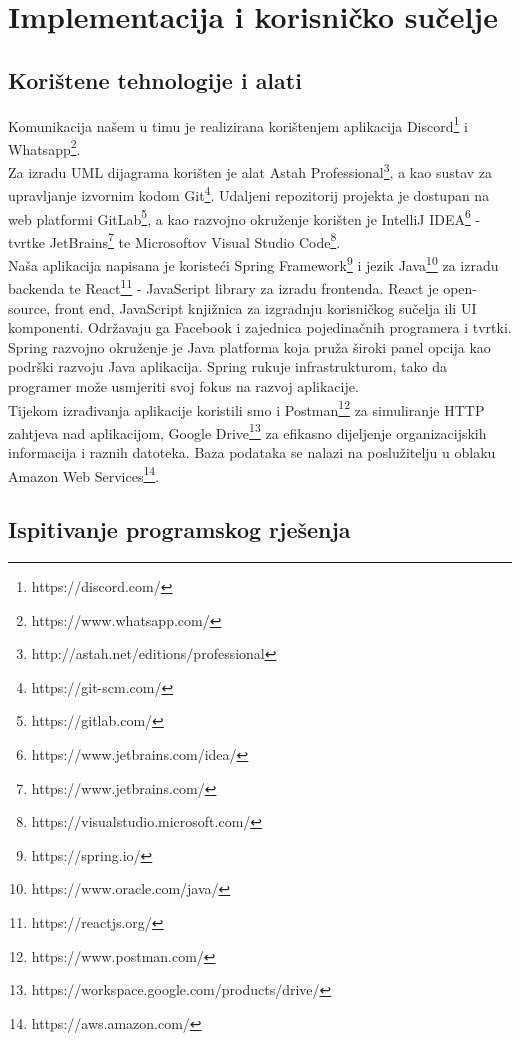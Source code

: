 \chapter{Implementacija i korisničko sučelje}
		
		
		\section{Korištene tehnologije i alati}

		Komunikacija našem u timu je realizirana korištenjem aplikacija Discord\footnote{https://discord.com/} i Whatsapp\footnote{https://www.whatsapp.com/}.\\ Za izradu UML dijagrama korišten je alat Astah Professional\footnote{http://astah.net/editions/professional}, a kao sustav za upravljanje
izvornim kodom Git\footnote{https://git-scm.com/}. Udaljeni repozitorij projekta je dostupan na web platformi GitLab\footnote{https://gitlab.com/}, a kao razvojno okruženje korišten je IntelliJ IDEA\footnote{https://www.jetbrains.com/idea/} - tvrtke JetBrains\footnote{https://www.jetbrains.com/} te Microsoftov Visual Studio Code\footnote{https://visualstudio.microsoft.com/
}. 
	\\
	 Naša aplikacija napisana je koristeći Spring Framework\footnote{https://spring.io/} i jezik Java\footnote{https://www.oracle.com/java/} za izradu backenda te React\footnote{https://reactjs.org/} - JavaScript library za izradu frontenda. React je open-source, front end, JavaScript knjižnica za izgradnju korisničkog sučelja ili UI komponenti. Održavaju ga Facebook i zajednica pojedinačnih programera i tvrtki. Spring razvojno okruženje je Java platforma koja pruža široki panel opcija kao podrški
razvoju Java aplikacija. Spring rukuje infrastrukturom, tako da programer može usmjeriti svoj
fokus na razvoj aplikacije. \\
Tijekom izrađivanja aplikacije koristili smo i Postman\footnote{https://www.postman.com/} za simuliranje HTTP zahtjeva nad aplikacijom, Google Drive\footnote{https://workspace.google.com/products/drive/} za efikasno dijeljenje organizacijskih informacija i raznih datoteka. 
Baza podataka se nalazi na poslužitelju u oblaku Amazon
Web Services\footnote{https://aws.amazon.com/}.			
			
			\eject 
		
	
		\section{Ispitivanje programskog rješenja}
			
